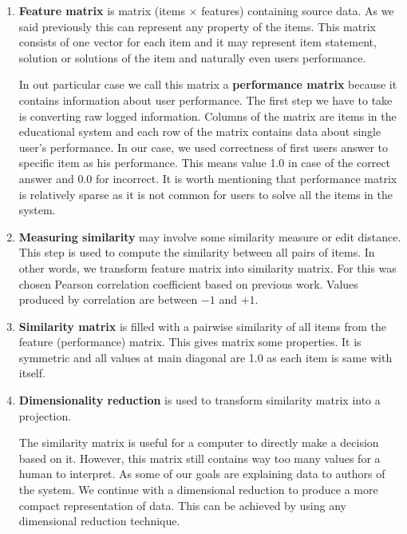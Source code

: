 \documentclass[
  digital, %
  table,   %
  nolof,     %
  nolot,     %
  nocover,
  color,
  final, %
]{fithesis3}
\begin{document}
\begin{enumerate}
  \item
    \textbf{Feature matrix} is matrix (items $\times$ features) containing source data. As we said previously this can represent any property of the items. This matrix consists of one vector for each item and it may represent item statement, solution or solutions of the item and naturally even users performance.

    In out particular case we call this matrix a \textbf{performance matrix} because it contains information about user performance. The first step we have to take is converting raw logged information. Columns of the matrix are items in the educational system and each row of the matrix contains data about single user's performance. In our case, we used correctness of first users answer to specific item as his performance. This means value 1.0 in case of the correct answer and 0.0 for incorrect. It is worth mentioning that performance matrix is relatively sparse as it is not common for users to solve all the items in the system.

  \item
    \textbf{Measuring similarity} may involve some similarity measure or edit distance. This step is used to compute the similarity between all pairs of items. In other words, we transform feature matrix into similarity matrix. For this was chosen Pearson correlation coefficient based on previous work. Values produced by correlation are between $-1$ and $+1$.

  \item
    \textbf{Similarity matrix} is filled with a pairwise similarity of all items from the feature (performance) matrix. This gives matrix some properties. It is symmetric and all values at main diagonal are 1.0 as each item is same with itself.

  \item
    \textbf{Dimensionality reduction} is used to transform similarity matrix into a projection.


    The similarity matrix is useful for a computer to directly make a decision based on it. However, this matrix still contains way too many values for a human to interpret. As some of our goals are explaining data to authors of the system. We continue with a dimensional reduction to produce a more compact representation of data. This can be achieved by using any dimensional reduction technique.


\end{enumerate}
\end{document}
